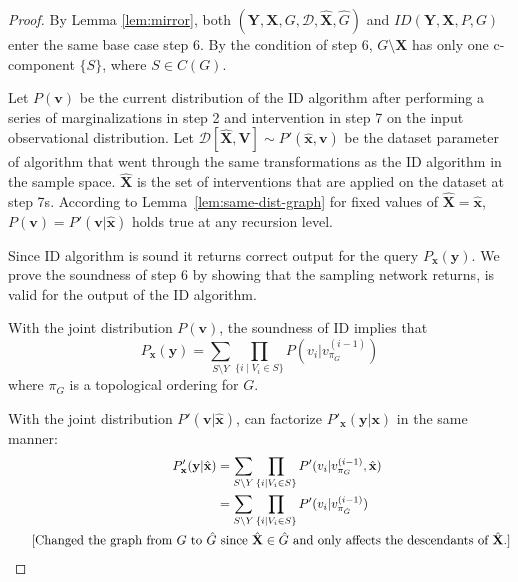 \documentclass{article}
\newcommand{\red}{\textcolor{red}}
\newcommand{\x}{\mathbf{x}}
\newcommand{\y}{\mathbf{y}}
\newcommand{\X}{\mathbf{X}}
\newcommand{\Xp}{{\hat{\mathbf{X}}}}
\newcommand{\xp}{{\hat{\mathbf{x}}}}
\newcommand{\Gp}{{\hat{{G}}}}
\newcommand{\Y}{\mathbf{Y}}
\newcommand{\V}{\mathbf{V}}
\newcommand{\vb}{\mathbf{v}}
\newcommand{\data}{\mathcal{D}}
\newcommand{\idgen}{\text{ID-GEN}\xspace}
\newcommand{\idgenpar}{\idgen$(\mathbf{Y}, \mathbf{X},  G,  \data, {\Xp}, \Gp)$\xspace}
\theoremstyle{plain}
\theoremstyle{definition}
\theoremstyle{remark}
\begin{document}
	\begin{proof}
		By Lemma \ref{lem:mirror},  both \idgenpar and $ID(\Y,\X, P, G)$ enter the same base case step $6$. By the condition of step $6$, $G\setminus \X$ has only one c-component $\{S\}$, where $S\in C(G)$.
		
	

Let $P(\vb)$ be the current distribution of the ID algorithm after performing a series of marginalizations in step 2 and intervention in step 7 on the input observational distribution.	
  Let $\data[\Xp, \V] \sim P'(\xp,\vb)$ be the dataset parameter of \idgen algorithm that went through the same transformations as the ID algorithm in the sample space. $\Xp$ is the set of interventions that are applied on the dataset at step 7s.
   According to Lemma~\ref{lem:same-dist-graph}
for fixed values of $\Xp=\xp$, $P(\vb) = P'(\vb|\xp)$ holds true at any recursion level.

	Since ID algorithm is sound it returns correct output for the query $P_{\x}(\y)$. We prove the soundness of \idgen step 6 by showing that the sampling network \idgen returns, is valid for the output of the ID algorithm.

 
		
		
		With the joint distribution $P(\vb)$, the soundness of ID implies that 
		\begin{equation}
			\label{eq:step6-id-factor}
			P_{\x}(\y)= \sum_{S\setminus Y}\prod_{\{i\mid V_i\in S\}}P(v_i| v_{\pi_G}^{(i-1)})    
		\end{equation}
		where $\pi_G$ is a topological ordering for $G$. 
		
		With the joint distribution $P'(\vb|\xp)$, \idgen can factorize $P'_{\x}(\y|\x)$ in the same manner:
		\begin{equation}
			\label{eq:step6-iddag-factor}
			\begin{split}
				P'_{\x}(\y|\xp)&=
				\sum_{S\setminus Y}\prod_{\{i\mid V_i\in S\}}P'(v_i| v_{\pi_{G}}^{(i-1)}, \xp)  \\
				&= \sum_{S\setminus Y}\prod_{\{i\mid V_i\in S\}}P'(v_i| v_{\pi_{\Gp}}^{(i-1)})  \\
				\text{\hspace{5mm} [Changed the graph from $G$ to $\Gp$} & \text{ since $\Xp \in \Gp$ and only affects the descendants of $\Xp$.]}
			\end{split}
		\end{equation}
		

\end{proof}
\end{document}
